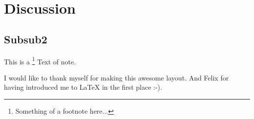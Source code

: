 \section{Discussion}

\lipsum[9]

\subsection{Subsub2}
\lipsum[100]
This is a \footnote{Something of a footnote here...} Text of note.

\lipsum[5]

\begin{Acknowledgements}
I would like to thank myself for making this awesome layout. And Felix for having introduced me to LaTeX in the first place :-).	
\end{Acknowledgements}

